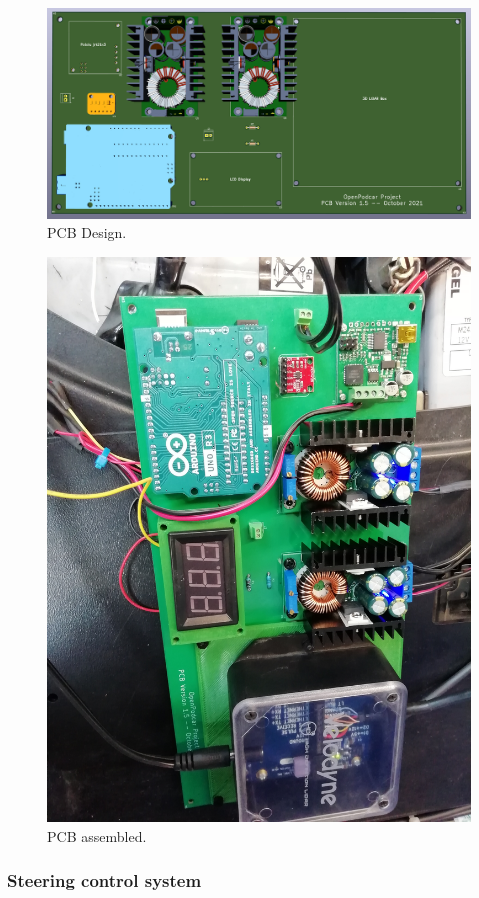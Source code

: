 \documentclass[a4paper]{article}
\begin{document}
\begin{figure}[h]
	\includegraphics[width=\columnwidth]{hardware/pcb_version_1_5_pic1.png}
	\caption{PCB Design.}
	\label{fig:pcb_design}
\end{figure}


\begin{figure}[h]
	\includegraphics[width=0.75\columnwidth, angle=90]{hardware/pcb_podcar.jpg}
	\caption{PCB assembled.}
	\label{fig:pcb_assembled}
\end{figure}



\subsubsection{Steering control system}
\end{document}
